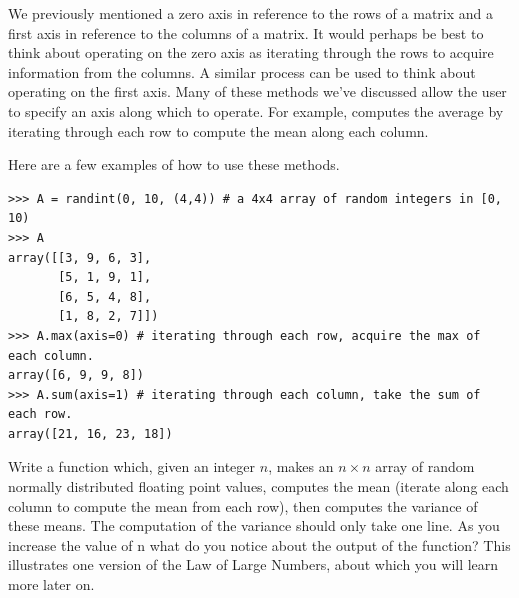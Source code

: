 We previously mentioned a zero axis in reference to the rows of a matrix
and a first axis in reference to the columns of a matrix. It would 
perhaps be best to think about operating on the zero axis as iterating
through the rows to acquire information from the columns. A similar process
can be used to think about operating on the first axis. 
Many of these methods we've discussed allow the user to specify an axis 
along which to operate. For example,  computes the average
by iterating through each row to compute the mean along each column. 

Here are a few examples of how to use these methods.
\begin{lstlisting}
>>> A = randint(0, 10, (4,4)) # a 4x4 array of random integers in [0, 10) 
>>> A
array([[3, 9, 6, 3],
       [5, 1, 9, 1],
       [6, 5, 4, 8],
       [1, 8, 2, 7]])
>>> A.max(axis=0) # iterating through each row, acquire the max of each column.
array([6, 9, 9, 8])
>>> A.sum(axis=1) # iterating through each column, take the sum of each row. 
array([21, 16, 23, 18])
\end{lstlisting}

\begin{problem}
Write a function which, given an integer $n$, makes an $n\times n$ array
of random normally distributed floating point values, computes the mean
(iterate along each column to compute the mean from each row), 
then computes the variance of these means. The
computation of the variance should only take one line. 
As you increase the value of n what do you notice about the output of 
the function? This illustrates one version of
the Law of Large Numbers, about which you will learn more later on.
\end{problem}

